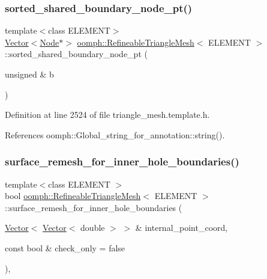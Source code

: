 \subsubsection{\texorpdfstring{sorted\+\_\+shared\+\_\+boundary\+\_\+node\+\_\+pt()}{sorted\_shared\_boundary\_node\_pt()}\hspace{0.1cm}{\footnotesize\ttfamily [2/2]}}
{\footnotesize\ttfamily template$<$class E\+L\+E\+M\+E\+NT$>$ \\
\hyperlink{classoomph_1_1Vector}{Vector}$<$\hyperlink{classoomph_1_1Node}{Node}$\ast$$>$ \hyperlink{classoomph_1_1RefineableTriangleMesh}{oomph\+::\+Refineable\+Triangle\+Mesh}$<$ E\+L\+E\+M\+E\+NT $>$\+::sorted\+\_\+shared\+\_\+boundary\+\_\+node\+\_\+pt (\begin{DoxyParamCaption}\item[{unsigned \&}]{b }\end{DoxyParamCaption})\hspace{0.3cm}{\ttfamily [inline]}}



Definition at line 2524 of file triangle\+\_\+mesh.\+template.\+h.



References oomph\+::\+Global\+\_\+string\+\_\+for\+\_\+annotation\+::string().

\mbox{\label{classoomph_1_1RefineableTriangleMesh_a7189d208a062fda132f6fa814e4385cf}} 
\subsubsection{\texorpdfstring{surface\+\_\+remesh\+\_\+for\+\_\+inner\+\_\+hole\+\_\+boundaries()}{surface\_remesh\_for\_inner\_hole\_boundaries()}}
{\footnotesize\ttfamily template$<$class E\+L\+E\+M\+E\+NT $>$ \\
bool \hyperlink{classoomph_1_1RefineableTriangleMesh}{oomph\+::\+Refineable\+Triangle\+Mesh}$<$ E\+L\+E\+M\+E\+NT $>$\+::surface\+\_\+remesh\+\_\+for\+\_\+inner\+\_\+hole\+\_\+boundaries (\begin{DoxyParamCaption}\item[{\hyperlink{classoomph_1_1Vector}{Vector}$<$ \hyperlink{classoomph_1_1Vector}{Vector}$<$ double $>$ $>$ \&}]{internal\+\_\+point\+\_\+coord,  }\item[{const bool \&}]{check\+\_\+only = {\ttfamily false} }\end{DoxyParamCaption})\hspace{0.3cm}{\ttfamily [protected]}, {\ttfamily [virtual]}}



